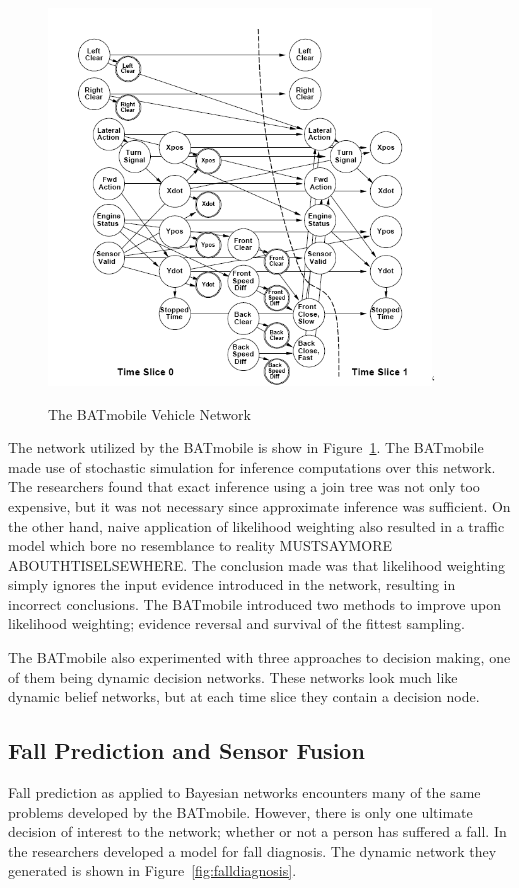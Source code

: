 \documentclass{article}
\begin{document}
\begin{figure}[here]
\begin{center}
\includegraphics[height=100mm]{figures/batmobile.png}`
\caption{The BATmobile Vehicle Network}
\label{fig:batmobile}
\end{center}
\end{figure}

The network utilized by the BATmobile is show in Figure~\ref{fig:batmobile}.
The BATmobile made use of stochastic simulation for inference computations over this network. The researchers found that exact inference using a join tree was not only too expensive, but it was not necessary since approximate inference was sufficient. On the other hand, naive application of likelihood weighting also resulted in a traffic model which bore no resemblance to reality MUSTSAYMORE ABOUTHTISELSEWHERE. The conclusion made was that likelihood weighting simply ignores the input evidence introduced in the network, resulting in incorrect conclusions. The BATmobile introduced two methods to improve upon likelihood weighting; evidence reversal and survival of the fittest sampling. 

The BATmobile also experimented with three approaches to decision making, one of them being dynamic decision networks. These networks look much like dynamic belief networks, but at each time slice they contain a decision node. 

\subsection{Fall Prediction and Sensor Fusion} 
Fall prediction as applied to Bayesian networks encounters many of the same problems developed by the BATmobile. However, there is only one ultimate decision of interest to the network; whether or not a person has suffered a fall. In \cite{nicholson96case} the researchers developed a model for fall diagnosis. 
The dynamic network they generated is shown in Figure~\ref{fig:falldiagnosis}.
\end{document}
